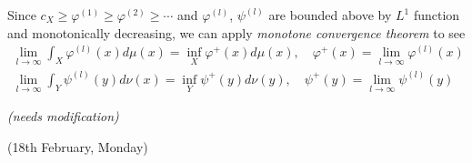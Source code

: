 \documentclass[12pt,a4paper]{article}
\newenvironment{proof}
{\begin{changemargin}{1cm}{0.5cm} 
	}%
	{\end{changemargin}
}
\newenvironment{p}
{\begin{proof} 
	}%
	{\end{proof}
}
\begin{document}
\begin{p}
\quad Since $c_X\geq \varphi^{(1)} \geq \varphi^{(2)} \geq \cdots$ and $\varphi^{(l)}$, $\psi^{(l)}$ are bounded above by $L^1$ function and monotonically decreasing, we can apply \emph{monotone convergence theorem} to see
\begin{align*}
\lim_{l\rightarrow \infty} \int_X \varphi^{(l)}(x) d\mu(x) = \inf_X \varphi^+(x) d\mu(x), \quad \varphi^+(x) = \lim_{l\rightarrow \infty} \varphi^{(l)}(x) \\
\lim_{l\rightarrow \infty} \int_Y \psi^{(l)}(y) d\nu(x) = \inf_Y \psi^+(y) d\nu(y), \quad \psi^+(y) = \lim_{l\rightarrow \infty} \psi^{(l)}(y) 
\end{align*}

\emph{(needs modification)}
\end{p}
\s

\newday

(18th February, Monday)
\s
\end{document}

